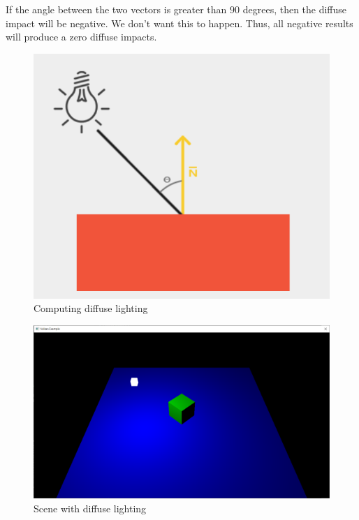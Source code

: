 If the angle between the two vectors is greater than $90$ degrees, then the
diffuse impact will be negative.
We don't want this to happen.
Thus, all negative results will produce a zero diffuse impacts.

\begin{figure}[ht]
    \centering
    \includegraphics[scale=0.40]{images/ChBlinnPhong/DiffuseLighting.png}
    \caption{Computing diffuse lighting}
    \label{fig::ComputingDiffuseLighting}
\end{figure}

\begin{minipage}{\linewidth}{\noindent}
    
\end{minipage}

\begin{figure}[ht]
    \centering
    \includegraphics[scale=0.25]{images/ChBlinnPhong/SceneDiffuse.png}
    \caption{Scene with diffuse lighting}
    \label{fig::SceneDiffuse}
\end{figure}

